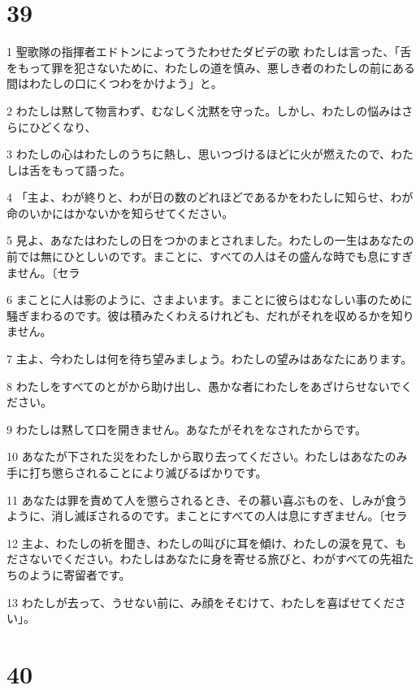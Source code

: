 \chapter{39}

\par 1 聖歌隊の指揮者エドトンによってうたわせたダビデの歌 わたしは言った、「舌をもって罪を犯さないために、わたしの道を慎み、悪しき者のわたしの前にある間はわたしの口にくつわをかけよう」と。
\par 2 わたしは黙して物言わず、むなしく沈黙を守った。しかし、わたしの悩みはさらにひどくなり、
\par 3 わたしの心はわたしのうちに熱し、思いつづけるほどに火が燃えたので、わたしは舌をもって語った。
\par 4 「主よ、わが終りと、わが日の数のどれほどであるかをわたしに知らせ、わが命のいかにはかないかを知らせてください。
\par 5 見よ、あなたはわたしの日をつかのまとされました。わたしの一生はあなたの前では無にひとしいのです。まことに、すべての人はその盛んな時でも息にすぎません。〔セラ
\par 6 まことに人は影のように、さまよいます。まことに彼らはむなしい事のために騒ぎまわるのです。彼は積みたくわえるけれども、だれがそれを収めるかを知りません。
\par 7 主よ、今わたしは何を待ち望みましょう。わたしの望みはあなたにあります。
\par 8 わたしをすべてのとがから助け出し、愚かな者にわたしをあざけらせないでください。
\par 9 わたしは黙して口を開きません。あなたがそれをなされたからです。
\par 10 あなたが下された災をわたしから取り去ってください。わたしはあなたのみ手に打ち懲らされることにより滅びるばかりです。
\par 11 あなたは罪を責めて人を懲らされるとき、その慕い喜ぶものを、しみが食うように、消し滅ぼされるのです。まことにすべての人は息にすぎません。〔セラ
\par 12 主よ、わたしの祈を聞き、わたしの叫びに耳を傾け、わたしの涙を見て、もださないでください。わたしはあなたに身を寄せる旅びと、わがすべての先祖たちのように寄留者です。
\par 13 わたしが去って、うせない前に、み顔をそむけて、わたしを喜ばせてください」。

\chapter{40}

